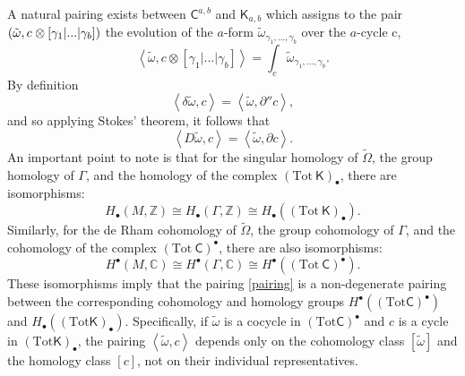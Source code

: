 \documentclass[a4paper,11pt]{article}
\newcommand{\stks}[1]{
	 \left< #1 \right>
}
\newcommand{\compfont}[1]{\bm{\mathsf{#1}}}
\begin{document}
A natural pairing exists between $\compfont{C}^{a,b}$ and $\compfont{K}_{a,b}$ which assigns to the pair $(\tilde{\omega},c\hspace{.1mm}\otimes[\gamma_1|...|\gamma_{b}])$ the evolution of the $a$-form $\tilde{\omega}_{\gamma_1,...,\gamma_b}$ over the $a$-cycle c,
\begin{equation}
\stks{\tilde{\omega},c\otimes[\gamma_1|...|\gamma_b]} = \int_{c} \tilde{\omega}_{\gamma_1,...,\gamma_b}.\label{pairing}
\end{equation}
By definition 
\begin{equation}
\stks{\delta\tilde\omega,c}=\stks{\tilde\omega,\partial'' c},
\end{equation}
and so applying Stokes' theorem, it follows that \begin{equation}
\stks{D\tilde\omega,c}=\stks{\tilde\omega,\partial c}.\label{Dpartial}
\end{equation}
An important point to note is that for the singular homology of $\tilde{\Omega}$, the group homology of $\Gamma$, and the homology of the complex $(\text{Tot}~\compfont{K})_\bullet$, there are isomorphisms:
\begin{equation}
H_{\bullet}(M,\mathbb{Z}) \cong H_{\bullet}(\Gamma,\mathbb{Z})\cong H_{\bullet}((\text{Tot}~\compfont{K})_\bullet).
\end{equation}
Similarly, for the de Rham cohomology of $\tilde{\Omega}$, the group cohomology of $\Gamma$, and the cohomology of the complex $(\text{Tot}~\compfont{C})^\bullet$, there are also isomorphisms:
\begin{equation}
H^{\bullet}(M,\mathbb{C}) \cong H^{\bullet}(\Gamma,\mathbb{C}) \cong H^{\bullet}((\text{Tot}~\compfont{C})^\bullet).
\end{equation}
These isomorphisms imply that the pairing \eqref{pairing} is a non-degenerate pairing between the corresponding cohomology and homology groups $H^{\bullet}((\text{Tot}\compfont{C})^\bullet)$ and $H_{\bullet}((\text{Tot}\compfont{K})_\bullet)$. Specifically, if $\tilde\omega$ is a cocycle in $(\text{Tot}\compfont{C})^{\bullet}$ and $c$ is a cycle in $(\text{Tot}\compfont{K})_\bullet$, the pairing $\stks{\tilde\omega,c}$ depends only on the cohomology class $[\tilde\omega]$ and the homology class $[c]$, not on their individual representatives. 
\end{document}

